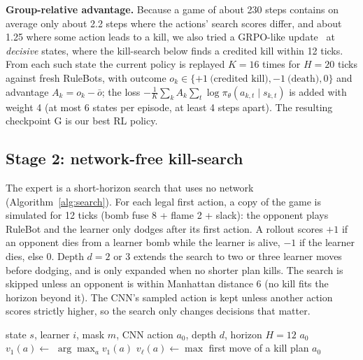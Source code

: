 \documentclass[conference]{IEEEtran}
\begin{document}
\textbf{Group-relative advantage.} Because a game of about 230 steps contains on average only about 2.2 steps where the actions' search scores differ, and about 1.25 where some action leads to a kill, we also tried a GRPO-like update~\cite{shao2024grpo} at \emph{decisive} states, where the kill-search below finds a credited kill within 12 ticks. From each such state the current policy is replayed $K=16$ times for $H=20$ ticks against fresh RuleBots, with outcome $o_k\in\{+1\ \text{(credited kill)},-1\ \text{(death)},0\}$ and advantage $A_k=o_k-\bar o$; the loss $-\frac1K\sum_k A_k\sum_{t}\log\pi_\theta(a_{k,t}\mid s_{k,t})$ is added with weight 4 (at most 6 states per episode, at least 4 steps apart). The resulting checkpoint G is our best RL policy.

\subsection{Stage 2: network-free kill-search}
The expert is a short-horizon search that uses no network (Algorithm~\ref{alg:search}). For each legal first action, a copy of the game is simulated for 12 ticks (bomb fuse 8 + flame 2 + slack): the opponent plays RuleBot and the learner only dodges after its first action. A rollout scores $+1$ if an opponent dies from a learner bomb while the learner is alive, $-1$ if the learner dies, else 0. Depth $d=2$ or 3 extends the search to two or three learner moves before dodging, and is only expanded when no shorter plan kills. The search is skipped unless an opponent is within Manhattan distance 6 (no kill fits the horizon beyond it). The CNN's sampled action is kept unless another action scores strictly higher, so the search only changes decisions that matter.

\begin{algorithm}[t]
\caption{Kill-search of depth $d$ (play time)}
\label{alg:search}
\small
\begin{algorithmic}[1]
\Require state $s$, learner $i$, mask $m$, CNN action $a_0$, depth $d$, horizon $H=12$
 \Return $a_0$ \EndIf
{}
  \State $v_1(a)\gets$  
\EndFor
{} \Return $\arg\max_a v_1(a)$ \EndIf
{} 
    \State $v_\ell(a)\gets\max$ 
  \EndFor
   \Return first move of a kill plan \EndIf
\EndFor
\State \Return $a_0$
\end{algorithmic}
\end{algorithm}
\end{document}
